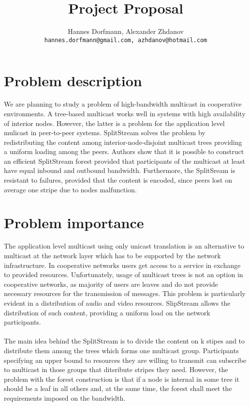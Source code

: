 \documentclass[a4paper,10pt]{article}
\title{Project Proposal}
\author{Hannes Dorfmann, Alexander Zhdanov \\
  \texttt{hannes.dorfmann@gmail.com, azhdanov@hotmail.com}}
\begin{document}
\maketitle

\section{Problem description}
We are planning to study a problem of high-bandwidth multicast in cooperative environments. 
A tree-based multicast works well in systems with high availability of interior nodes. 
However, the latter is a problem for the application level mulicast in peer-to-peer systems. 
SplitStream \cite{castro1} solves the problem by redistributing the content among interior-node-disjoint
multicast trees providing a uniform loading among the peers. Authors \cite{castro1} show that it is possible
to construct an efficient SplitStream forest provided that participants of the multicast at least have equal
inbound and outbound bandwidth. Furthermore, the SplitSream is resistant to failures, provided that the content
is encoded, since peers lost on average one stripe due to nodes malfunction.
\section{Problem importance}
The application level multicast using only unicast translation is an alternative to multicast at the network layer
which has to be supported by the network infrastructure. In cooperative networks users get access to a service in exchange
to provided resources. Unfortunately, usage of multicast trees is not an option in cooperative networks, as majority of
users are leaves and do not provide necessary resources for the transmission of messages. This problem is particularly
evident in  a distribution of audio and video resources. SlipStream allows the distribution of such content, providing a
uniform load on the network participants.
\paragraph{}
The main idea behind the SplitStream is to divide the content on k stipes and to distribute them among the trees which forms
one multicast group. Participants specifying an upper bound to resources they are willing to transmit can subscribe to
multicast in those groups that ditsribute stripes they need. However, the problem with the forest construction is that if
a node is internal in some tree it should be a leaf in all others and, at the same time, the forest shall meet the
requirements imposed on the bandwidth.
\end{document}
